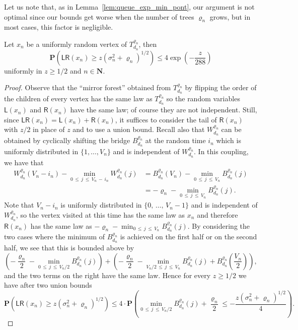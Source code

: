 \documentclass[10pt]{amsart}
\theoremstyle{definition}\newtheorem{defi}[theo]{Definition}\newtheorem{rema}[theo]{Remark}\newtheorem{exam}[theo]{Example}\newtheorem{exem}[theo]{Example}\newtheorem{nota}[theo]{Notation}
\newcommand{\ensembles}[1]{\mathbf{#1}}
\newcommand{\N}{\ensembles{N}}
\renewcommand{\P}{\ensembles{P}}
\renewcommand{\Pr}[1]{\P\left(#1\right)}
\newcommand{\1}{\ensembles{1}}
\renewcommand{\le}{\leqslant}
\renewcommand{\ge}{\geqslant}
\newcommand{\LL}{\mathsf{L}}
\newcommand{\RR}{\mathsf{R}}
\newcommand{\LR}{\mathsf{LR}}
\newcommand{\fn}{T_{d_n}^{\varrho_n}}
\newcommand{\Wfn}{W_{d_n}^{\varrho_n}}
\newcommand{\Bfn}{B_{d_n}^{\varrho_n}}
\newcommand{\vertices}{V}
\providecommand{\?}{}
\begin{document}
Let us note that, as in Lemma~\ref{lem:queue_exp_min_pont}, our argument is not optimal since our bounds get worse when the number of trees $\varrho_n$ grows, but in most cases, this factor is negligible.


\begin{prop}\label{prop:queues_exp_Luka}
Let $x_n$ be a uniformly random vertex of $\fn$, then
\[
\Pr{\LR(x_n) \ge z \left(\sigma_n^2+\varrho_n\right)^{1/2}} \le 4 \exp\left(- \frac{z}{288}\right)
\]
uniformly in $z \ge 1/2$ and $n \in \N$.
\end{prop}



\begin{proof}
Observe that the ``mirror forest'' obtained from $\fn$ by flipping the order of the children of every vertex has the same law as $\fn$ so the random variables $\LL(x_n)$ and $\RR(x_n)$ have the same law; of course they are not independent. Still, since $\LR(x_n) = \LL(x_n)+\RR(x_n)$, it suffices to consider the tail of $\RR(x_n)$ with $z/2$ in place of $z$ and to use a union bound. Recall also that $\Wfn$ can be obtained by cyclically shifting the bridge $\Bfn$ at the random time $i_n$ which is uniformly distributed in $\{1, \dots, \vertices_n\}$ and is independent of $\Wfn$. In this coupling, we have that
\begin{align*}
\Wfn\left(\vertices_n - i_n\right) - \min_{0\,\le\,j\,\le\,\vertices_n\,-\,i_n} \Wfn(j) &= \Bfn\left(\vertices_n\right) - \min_{0\,\le\,j\,\le\, \vertices_n} \Bfn(j)
\\
&= -\varrho_n - \min_{0\,\le\,j\,\le\,\vertices_n} \Bfn(j).
\end{align*}
Note that $\vertices_n - i_n$ is uniformly distributed in $\{0,\,\dots,\,\vertices_n - 1\}$ and is independent of $\Wfn$, so the vertex visited at this time has the same law as $x_n$ and therefore $\RR(x_n)$ has the same law as $-\varrho_n - \min_{0\,\le\,j\,\le\,\vertices_n} \Bfn(j)$. By considering the two cases where the minimum of $\Bfn$ is achieved on the first half or on the second half, we see that this is bounded above by
\[
\left(- \frac{\varrho_n}{2} - \min_{0\,\le\,j\,\le\, \vertices_n/2} \Bfn(j)\right) + \left(- \frac{\varrho_n}{2} - \min_{\vertices_n/2\,\le\,j\,\le\,\vertices_n} \Bfn(j) + \Bfn\left(\frac{\vertices_n}{2}\right)\right),
\]
and the two terms on the right have the same law. Hence for every $z \ge 1/2$ we have after two union bounds
\[
\Pr{\LR(x_n) \ge z \left(\sigma_n^2+\varrho_n\right)^{1/2}}
\le 4 \cdot \Pr{\min_{0\,\le\,j\,\le\,\vertices_n/2} \Bfn(j) + \frac{\varrho_n}{2} \le - \frac{z \left(\sigma_n^2+\varrho_n\right)^{1/2}}{4}}.
\]
\end{proof}
\end{document}
